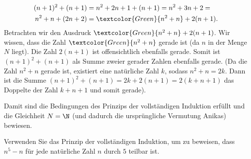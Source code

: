 \begin{myexample}
\begin{enumerate}
	      \begin{align*}
		      (n+1)^2+(n+1)  & = n^2+2n+1+(n+1) = n^2+3n+2 =        \\
		      n^2+n + (2n+2) & = \textcolor{Green}{n^2+n} + 2(n+1).
	      \end{align*}
	      Betrachten wir den Ausdruck $\textcolor{Green}{n^2+n} + 2(n+1)$. Wir wissen, dass die Zahl $\textcolor{Green}{n^2+n}$ gerade ist (da $n$ in der Menge $N$ liegt). Die Zahl $2(n+1)$ ist offensichtlich ebenfalls gerade. Somit ist $(n+1)^2+(n+1)$ als Summe zweier gerader Zahlen ebenfalls gerade. (Da die Zahl $n^2+n$ gerade ist, existiert eine natürliche Zahl $k$, sodass $n^2+n = 2k$. Dann ist die Summe $(n+1)^2+(n+1) = 2k + 2(n+1) = 2(k+n+1)$ das Doppelte der Zahl $k+n+1$ und somit gerade). \checkmark
\end{enumerate}
Damit sind die Bedingungen des Prinzips der vollständigen Induktion erfüllt und die Gleichheit $N = \N$ (und dadurch die ursprüngliche Vermutung Anikas) bewiesen.
\end{myexample}

\begin{myexercise}\label{myexercise:0299}
	Verwenden Sie das Prinzip der vollständigen Induktion, um zu beweisen, dass $n^5-n$ für jede natürliche Zahl $n$ durch $5$ teilbar ist.
\end{myexercise}

